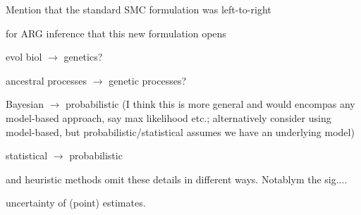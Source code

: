 \begin{point}{}
Mention that the standard SMC formulation was left-to-right
\end{point}


\begin{point}{\revref} %
 for ARG inference that this new formulation opens
\end{point}



\begin{point}{\revref} %
 evol biol $\to$ genetics?
\end{point}


\begin{point}{\revref} %
 ancestral processes $\to$ genetic processes?
\end{point}


\begin{point}{\revref} %
 Bayesian $\to$ probabilistic (I think this is more general and would encompas any model-based approach, say max likelihood etc.; alternatively consider using model-based, but probabilistic/statistical assumes we have an underlying model)
\end{point}


\begin{point}{\revref} %
 statistical $\to$ probabilistic
\end{point}


\begin{point}{\revref} %
 and heuristic methods omit these details in different ways. Notablym the sig....
\end{point}


\begin{point}{\revref} %
 uncertainty of (point) estimates.
\end{point}

